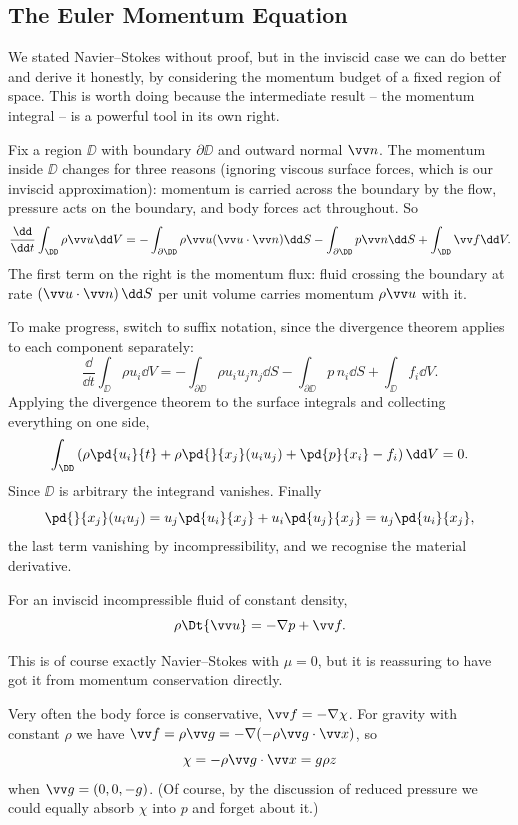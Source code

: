 \subsection{The Euler Momentum Equation}

We stated Navier--Stokes without proof, but in the inviscid case we can do better and derive it honestly, by considering the momentum budget of a fixed region of space. This is worth doing because the intermediate result -- the momentum integral -- is a powerful tool in its own right.

Fix a region $\DD$ with boundary $\partial \DD$ and outward normal $\vv n$. The momentum inside $\DD$ changes for three reasons (ignoring viscous surface forces, which is our inviscid approximation): momentum is carried across the boundary by the flow, pressure acts on the boundary, and body forces act throughout. So
$$
\frac{\dd}{\dd t}\int_\DD \rho \vv u \dd V = -\int_{\partial\DD} \rho \vv u (\vv u \cdot \vv n) \dd S - \int_{\partial \DD} p \vv n \dd S + \int_\DD \vv f \dd V.
$$
The first term on the right is the momentum flux: fluid crossing the boundary at rate $(\vv u \cdot \vv n)\, \dd S$ per unit volume carries momentum $\rho \vv u$ with it.

To make progress, switch to suffix notation, since the divergence theorem applies to each component separately:
$$
\frac{\dd}{\dd t} \int_\DD \rho u_i \dd V = -\int_{\partial \DD} \rho u_i u_j n_j \dd S - \int_{\partial\DD} p\, n_i \dd S + \int_\DD f_i \dd V.
$$
Applying the divergence theorem to the surface integrals and collecting everything on one side,
$$
\int_\DD \left(\rho \pd{u_i}{t} + \rho \pd{}{x_j}(u_i u_j) + \pd{p}{x_i} - f_i \right) \dd V = 0.
$$
Since $\DD$ is arbitrary the integrand vanishes. Finally
$$
\pd{}{x_j}(u_i u_j) = u_j \pd{u_i}{x_j} + u_i \pd{u_j}{x_j} = u_j \pd{u_i}{x_j},
$$
the last term vanishing by incompressibility, and we recognise the material derivative.

\begin{proposition}
	For an inviscid incompressible fluid of constant density,
	$$
	\rho \Dt{\vv u} = -\nabla p + \vv f.
	$$
\end{proposition}

This is of course exactly Navier--Stokes with $\mu = 0$, but it is reassuring to have got it from momentum conservation directly.

Very often the body force is conservative, $\vv f = -\nabla \chi$. For gravity with constant $\rho$ we have $\vv f = \rho \vv g = -\nabla(-\rho \vv g \cdot \vv x)$, so
$$
\chi = -\rho \vv g \cdot \vv x = g \rho z
$$
when $\vv g = (0,0,-g)$. (Of course, by the discussion of reduced pressure we could equally absorb $\chi$ into $p$ and forget about it.)

